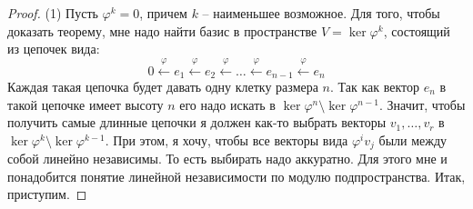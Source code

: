 \begin{proof}
(1) Пусть $\varphi^k = 0$, причем $k$ -- наименьшее возможное.
Для того, чтобы доказать теорему, мне надо найти базис в пространстве $V = \ker \varphi^k$, состоящий из цепочек вида:
\[
0\stackrel{\varphi}{\longleftarrow}e_1\stackrel{\varphi}{\longleftarrow}e_2 \stackrel{\varphi}{\longleftarrow}\ldots\stackrel{\varphi}{\longleftarrow}e_{n-1}\stackrel{\varphi}{\longleftarrow}e_n
\]
Каждая такая цепочка будет давать одну клетку размера $n$.
Так как вектор $e_n$ в такой цепочке имеет высоту $n$ его надо искать в $\ker \varphi^{n}\setminus\ker\varphi^{n-1}$.
Значит, чтобы получить самые длинные цепочки я должен как-то выбрать векторы $v_1,\ldots, v_r$ в $\ker\varphi^k \setminus \ker \varphi^{k-1}$.
При этом, я хочу, чтобы все векторы вида $\varphi^i v_j$ были между собой линейно независимы.
То есть выбирать надо аккуратно.
Для этого мне и понадобится понятие линейной независимости по модулю подпространства.
Итак, приступим.


\end{proof}
